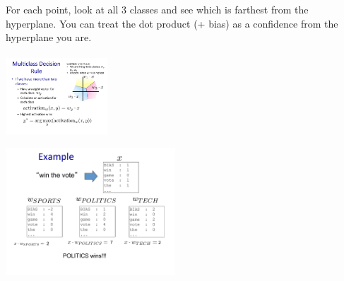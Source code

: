 For each point, look at all 3 classes and see which is farthest from the hyperplane.
You can treat the dot product (+ bias) as a confidence from the hyperplane you are.  %
\hfill \\ 
\hfill \\
 
\includegraphics[width=1.5in]{figures/multiclass_decision_rule_planes.pdf}
 
\includegraphics[width=2.5in]{figures/perceptron_multiclass--win_the_vote.pdf}

